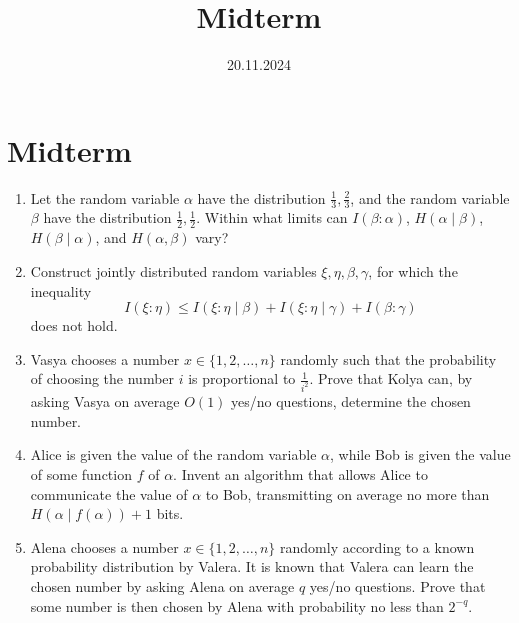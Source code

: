 \documentclass[a4paper,14pt]{extarticle}
\title{Midterm}
\date{20.11.2024}
\author{}
\begin{document}
    \maketitle

    \section*{Midterm}

    \begin{enumerate}
        \item Let the random variable $\alpha$ have the distribution $\frac{1}{3}, \frac{2}{3}$, and the random variable $\beta$ have the distribution $\frac{1}{2}, \frac{1}{2}$. Within what limits can $I(\beta:\alpha)$, $H(\alpha \mid \beta)$, $H(\beta \mid \alpha)$, and $H(\alpha, \beta)$ vary?

        \item Construct jointly distributed random variables $\xi, \eta, \beta, \gamma$, for which the inequality $$ I(\xi : \eta) \leq I(\xi : \eta \mid \beta) + I(\xi : \eta \mid \gamma) + I(\beta : \gamma) $$ does not hold.

        \item Vasya chooses a number $x \in \{1, 2, \dots, n\}$ randomly such that the probability of choosing the number $i$ is proportional to $\frac{1}{i^2}$. Prove that Kolya can, by asking Vasya on average $O(1)$ yes/no questions, determine the chosen number.

        \item Alice is given the value of the random variable $\alpha$, while Bob is given the value of some function $f$ of $\alpha$. Invent an algorithm that allows Alice to communicate the value of $\alpha$ to Bob, transmitting on average no more than $H(\alpha \mid f(\alpha)) + 1$ bits.

        \item Alena chooses a number $x \in \{1, 2, \dots, n\}$ randomly according to a known probability distribution by Valera. It is known that Valera can learn the chosen number by asking Alena on average $q$ yes/no questions. Prove that some number is then chosen by Alena with probability no less than $2^{-q}$.


    \end{enumerate}
\end{document}
